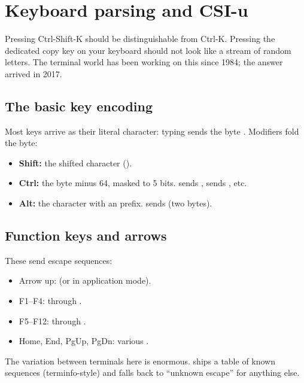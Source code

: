 \chapter{Keyboard parsing and CSI-u}
\label{ch:keyboard}

\begin{aside}
Pressing Ctrl-Shift-K should be distinguishable from Ctrl-K.
Pressing the dedicated copy key on your keyboard should not look
like a stream of random letters. The terminal world has been
working on this since 1984; the answer arrived in 2017.
\end{aside}

\section{The basic key encoding}

Most keys arrive as their literal character: typing 
sends the byte . Modifiers fold the byte:

\begin{itemize}[leftmargin=*]
  \item \textbf{Shift:} the shifted character ().
  \item \textbf{Ctrl:} the byte minus 64, masked to 5 bits.
     sends ,  sends
    , etc.
  \item \textbf{Alt:} the character with an  prefix.
     sends  (two bytes).
\end{itemize}

\section{Function keys and arrows}

These send escape sequences:

\begin{itemize}[leftmargin=*]
  \item Arrow up: \code{ESC [ A} (or  in
    application mode).
  \item F1--F4:  through .
  \item F5--F12: \code{ESC [ 15~} through \code{ESC [ 24~}.
  \item Home, End, PgUp, PgDn: various \code{ESC [ ... ~}.
\end{itemize}

The variation between terminals here is enormous. \maya{} ships
a table of known sequences (terminfo-style) and falls back to
``unknown escape'' for anything else.

